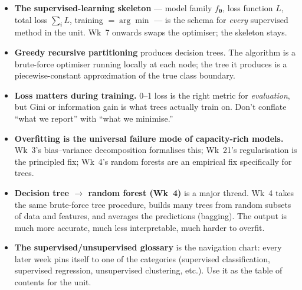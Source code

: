 \documentclass[11pt, a4paper]{article}
\begin{document}
\begin{tldrbox}
\begin{itemize}[leftmargin=*]
  \item \textbf{The supervised-learning skeleton} — model family $f_{\boldsymbol\theta}$, loss function $L$, total loss $\sum_i L$, training $= \arg\min$ — is the schema for \emph{every} supervised method in the unit. Wk~7 onwards swaps the optimiser; the skeleton stays.
  \item \textbf{Greedy recursive partitioning} produces decision trees. The algorithm is a brute-force optimiser running locally at each node; the tree it produces is a piecewise-constant approximation of the true class boundary.
  \item \textbf{Loss matters during training.} 0--1 loss is the right metric for \emph{evaluation}, but Gini or information gain is what trees actually train on. Don't conflate ``what we report'' with ``what we minimise.''
  \item \textbf{Overfitting is the universal failure mode of capacity-rich models.} Wk~3's bias--variance decomposition formalises this; Wk~21's regularisation is the principled fix; Wk~4's random forests are an empirical fix specifically for trees.
  \item \textbf{Decision tree $\rightarrow$ random forest (Wk~4)} is a major thread. Wk~4 takes the same brute-force tree procedure, builds many trees from random subsets of data and features, and averages the predictions (bagging). The output is much more accurate, much less interpretable, much harder to overfit.
  \item \textbf{The supervised/unsupervised glossary} is the navigation chart: every later week pins itself to one of the categories (supervised classification, supervised regression, unsupervised clustering, etc.). Use it as the table of contents for the unit.
\end{itemize}
\end{tldrbox}
\end{document}
